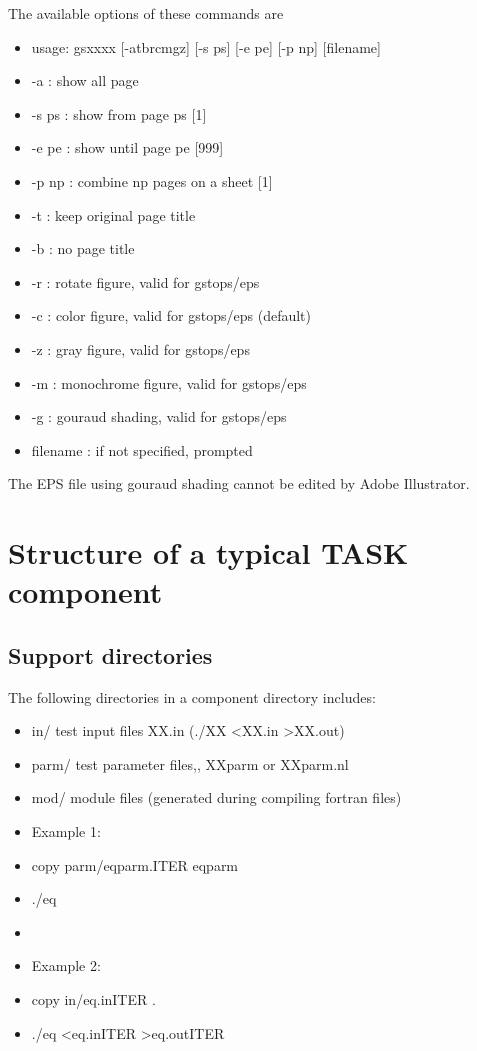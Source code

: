 \documentclass[11pt]{article}
\begin{document}
The available options of these commands are
\begin{itemize}
\item[]
usage: gsxxxx [-atbrcmgz] [-s ps] [-e pe] [-p np] [filename]
\item[\quad]-a    : show all page
\item[\quad]-s ps : show from page ps [1]
\item[\quad]-e pe : show until page pe [999]
\item[\quad]-p np : combine np pages on a sheet [1]
\item[\quad]-t    : keep original page title
\item[\quad]-b    : no page title
\item[\quad]-r    : rotate figure, valid for gstops/eps 
\item[\quad]-c    : color figure, valid for gstops/eps (default)
\item[\quad]-z    : gray figure, valid for gstops/eps 
\item[\quad]-m    : monochrome figure, valid for gstops/eps 
\item[\quad]-g    : gouraud shading, valid for gstops/eps 
\item[\quad]filename : if not specified, prompted
\end{itemize}

The EPS file using gouraud shading cannot be edited by Adobe Illustrator.

\section{Structure of a typical TASK component}

\subsection{Support directories}

The following directories in a component directory includes:
\begin{itemize}
\item[] in/ test input files XX.in (./XX <XX.in >XX.out)
\item[] parm/ test parameter files,, XXparm or XXparm.nl
\item[] mod/ module files (generated during compiling fortran files)
\end{itemize}

\begin{itemize}
\item[] Example 1:
\item[\quad] copy parm/eqparm.ITER eqparm
\item[\quad] ./eq
\item[\quad]
\item[] Example 2:
\item[\quad] copy in/eq.inITER .
\item[\quad] ./eq <eq.inITER >eq.outITER
\end{itemize}
\end{document}
